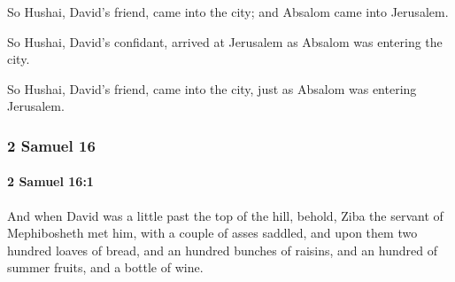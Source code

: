 			\begin{versebox}
					\item[BHS] 
					\item[ASV] So Hushai, David's friend, came into the city; and Absalom came into Jerusalem.
					\item[NIV] So Hushai, David’s confidant, arrived at Jerusalem as Absalom was entering the city.
					\item[NRSV] So Hushai, David’s friend, came into the city, just as Absalom was entering Jerusalem.
			\end{versebox}
	\subsubsection{2 Samuel 16} %
		\label{2SAMUEL-16}

		\paragraph{2 Samuel 16:1} %
			\label{2SAMUEL-16-1}

			And when David was a little past the top of the hill, behold, Ziba the servant of Mephibosheth met him, with a couple of asses saddled, and upon them two hundred loaves of bread, and an hundred bunches of raisins, and an hundred of summer fruits, and a bottle of wine.

